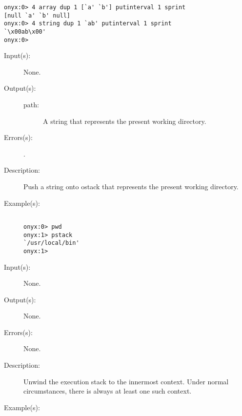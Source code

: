 \begin{description}
\begin{description}
\begin{verbatim}
onyx:0> 4 array dup 1 [`a' `b'] putinterval 1 sprint
[null `a' `b' null]
onyx:0> 4 string dup 1 `ab' putinterval 1 sprint
`\x00ab\x00'
onyx:0>
		\end{verbatim}
	\end{description}
\label{systemdict:pwd}
\item[{\onyxop{--}{pwd}{path}}: ]
	\begin{description}\item[]
	\item[Input(s): ] None.
	\item[Output(s): ]
		\begin{description}\item[]
		\item[path: ]
			A string that represents the present working directory.
		\end{description}
	\item[Errors(s): ]
		\begin{description}\item[]
		\item[.]
		\end{description}
	\item[Description: ]
		Push a string onto ostack that represents the present working
		directory.
	\item[Example(s): ]\begin{verbatim}

onyx:0> pwd
onyx:1> pstack
`/usr/local/bin'
onyx:1>
		\end{verbatim}
	\end{description}
\label{systemdict:quit}
\item[{\onyxop{--}{quit}{--}}: ]
	\begin{description}\item[]
	\item[Input(s): ] None.
	\item[Output(s): ] None.
	\item[Errors(s): ] None.
	\item[Description: ]
		Unwind the execution stack to the innermost
		 context.  Under
		normal circumstances, there is always at least one such context.
	\item[Example(s): ]\begin{verbatim}


\end{verbatim}
\end{description}
\end{description}
